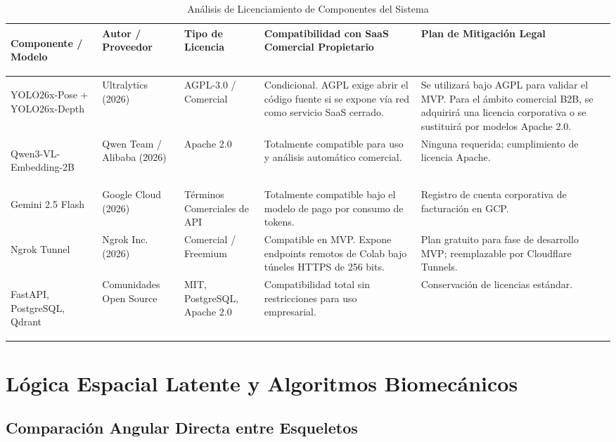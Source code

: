 \documentclass[12pt,letterpaper]{article}
\begin{document}
\begin{table}[htbp]
\centering
\footnotesize
\begin{tabularx}{\textwidth}{|>{\bfseries\raggedright\arraybackslash}X|>{\raggedright\arraybackslash}X|>{\raggedright\arraybackslash}X|>{\raggedright\arraybackslash}X|>{\raggedright\arraybackslash}X|}
    \hline
    Componente / Modelo & Autor / Proveedor & Tipo de Licencia & Compatibilidad con SaaS Comercial Propietario & Plan de Mitigación Legal \\ \hline
    YOLO26x-Pose + YOLO26x-Depth & Ultralytics (2026) & AGPL-3.0 / Comercial & Condicional. AGPL exige abrir el código fuente si se expone vía red como servicio SaaS cerrado. & Se utilizará bajo AGPL para validar el MVP. Para el ámbito comercial B2B, se adquirirá una licencia corporativa o se sustituirá por modelos Apache 2.0. \\ \hline
    Qwen3-VL-Embedding-2B & Qwen Team / Alibaba (2026) & Apache 2.0 & Totalmente compatible para uso y análisis automático comercial. & Ninguna requerida; cumplimiento de licencia Apache. \\ \hline
    Gemini 2.5 Flash & Google Cloud (2026) & Términos Comerciales de API & Totalmente compatible bajo el modelo de pago por consumo de tokens. & Registro de cuenta corporativa de facturación en GCP. \\ \hline
    Ngrok Tunnel & Ngrok Inc. (2026) & Comercial / Freemium & Compatible en MVP. Expone endpoints remotos de Colab bajo túneles HTTPS de 256 bits. & Plan gratuito para fase de desarrollo MVP; reemplazable por Cloudflare Tunnels. \\ \hline
    FastAPI, PostgreSQL, Qdrant & Comunidades Open Source & MIT, PostgreSQL, Apache 2.0 & Compatibilidad total sin restricciones para uso empresarial. & Conservación de licencias estándar. \\ \hline
\end{tabularx}
\caption{Análisis de Licenciamiento de Componentes del Sistema}
\label{tab:licencias}
\end{table}

\section{Lógica Espacial Latente y Algoritmos Biomecánicos}

\subsection{Comparación Angular Directa entre Esqueletos}
\end{document}
